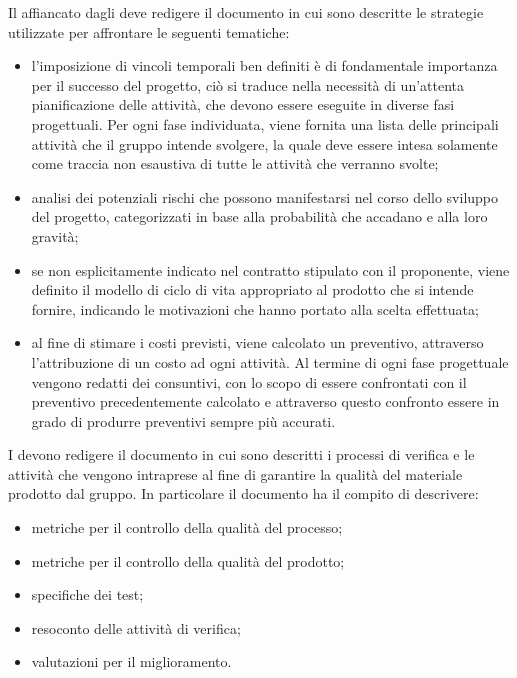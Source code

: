 Il \responsabile{} affiancato dagli \amministratori{} deve redigere il documento \PdPv{} in cui sono descritte le strategie utilizzate per affrontare le seguenti tematiche:

\begin{itemize}
    \item l'imposizione di vincoli temporali ben definiti \`{e} di fondamentale importanza per il successo del progetto, ci\`{o} si traduce nella necessit\`{a} di un'attenta pianificazione delle attivit\`{a}, che devono essere eseguite in diverse fasi progettuali. Per ogni fase individuata, viene fornita una lista delle principali attivit\`{a} che il gruppo intende svolgere, la quale deve essere intesa solamente come traccia non esaustiva di tutte le attivit\`{a} che verranno svolte;
    \item analisi dei potenziali rischi che possono manifestarsi nel corso dello sviluppo del progetto, categorizzati in base alla probabilit\`{a} che accadano e alla loro gravit\`{a};
    \item se non esplicitamente indicato nel contratto stipulato con il proponente, viene definito il modello di ciclo di vita appropriato al prodotto che si intende fornire, indicando le motivazioni che hanno portato alla scelta effettuata;
    \item al fine di stimare i costi previsti, viene calcolato un preventivo, attraverso l'attribuzione di un costo ad ogni attivit\`{a}. Al termine di ogni fase progettuale vengono redatti dei consuntivi, con lo scopo di essere confrontati con il preventivo precedentemente calcolato e attraverso questo confronto essere in grado di produrre preventivi sempre pi\`{u} accurati.
\end{itemize}

I \verificatori{} devono redigere il documento \PdQv{} in cui sono descritti i processi di verifica e le attivit\`{a} che vengono intraprese al fine di garantire la qualit\`{a} del materiale prodotto dal gruppo. In particolare il documento ha il compito di descrivere:

\begin{itemize}
    \item metriche per il controllo della qualit\`{a} del processo;
    \item metriche per il controllo della qualit\`{a} del prodotto;
    \item specifiche dei test;
    \item resoconto delle attivit\`{a} di verifica;
    \item valutazioni per il miglioramento.
\end{itemize}
